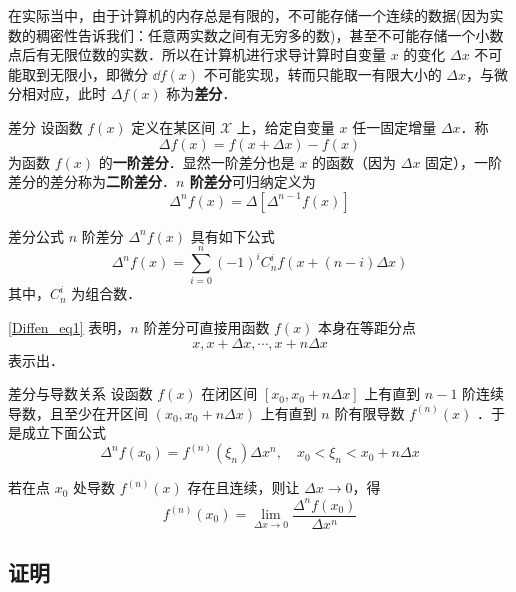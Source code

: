 在实际当中，由于计算机的内存总是有限的，不可能存储一个连续的数据(因为实数的稠密性告诉我们：任意两实数之间有无穷多的数)，甚至不可能存储一个小数点后有无限位数的实数．所以在计算机进行求导计算时自变量 $x$ 的变化 $\Delta x$ 不可能取到无限小，即微分 $\dd f({x})$ 不可能实现，转而只能取一有限大小的 $\Delta x$，与微分相对应，此时 $\Delta f(x)$ 称为\textbf{差分}．
\begin{definition}{差分}
设函数 $f(x)$ 定义在某区间 $\mathcal{X}$ 上，给定自变量 $x$ 任一固定增量 $\Delta x$．称
\begin{equation}
\Delta f(x)=f(x+\Delta x)-f(x)
\end{equation}
为函数 $f(x)$ 的\textbf{一阶差分}．显然一阶差分也是 $x$ 的函数（因为 $\Delta x$ 固定），一阶差分的差分称为\textbf{二阶差分}．\textbf{$n$ 阶差分}可归纳定义为
\begin{equation}
\Delta^n f(x)=\Delta[\Delta^{n-1}f(x)]
\end{equation}
\end{definition}
\begin{theorem}{差分公式}\label{Diffen_the1}
$n$ 阶差分 $\Delta^n f(x)$ 具有如下公式
\begin{equation}\label{Diffen_eq1}
\Delta^nf(x)=\sum_{i=0}^n(-1)^iC_n^if(x+(n-i)\Delta x)
\end{equation}
其中，$C_n^i$ 为组合数．
\end{theorem}
\autoref{Diffen_eq1} 表明，$n$ 阶差分可直接用函数 $f(x)$ 本身在等距分点
\begin{equation}
x,x+\Delta x,\cdots,x+n\Delta x
\end{equation}
表示出．
\begin{theorem}{差分与导数关系}\label{Diffen_the2}
设函数 $f(x)$ 在闭区间 $[x_0,x_0+n\Delta x]$ 上有直到 $n-1$ 阶连续导数，且至少在开区间 $(x_0,x_0+n\Delta x)$ 上有直到 $n$ 阶有限导数 $f^{(n)}(x)$ ．于是成立下面公式
\begin{equation}\label{Diffen_eq2}
\Delta^nf(x_0)=f^{(n)}(\xi_n)\Delta x^n ,\quad x_0<\xi_n<x_0+n\Delta x
\end{equation}
\end{theorem}
若在点 $x_0$ 处导数 $f^{(n)}(x)$ 存在且连续，则让 $\Delta x\rightarrow0$，得
\begin{equation}
f^{(n)}(x_0)=\lim_{\Delta x\rightarrow0}\frac{\Delta^n f(x_0)}{\Delta x^n}
\end{equation}

\subsection{证明}
